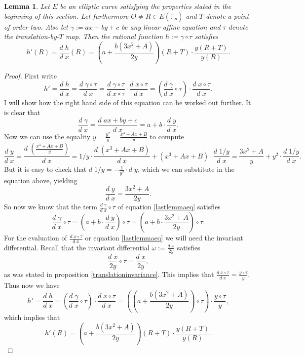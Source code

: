 \documentclass{article}
\numberwithin{equation}{section}
\newtheorem{lemma}[theorem]{Lemma}
\theoremstyle{definition}
\newcommand{\FF}[1]{{\mathbb F}_{#1}} %
\begin{document}
\begin{lemma}
Let $E$ be an elliptic curve satisfying the properties stated in the beginning of this section. Let furthermore $O\neq R\in E(\FF{p})$ and $T$ denote a point of order two. Also let $\gamma:=ax+by+c$ be any linear affine equation and $\tau$ denote the translation-by-$T$ map. Then the rational function $h:=\gamma \circ \tau$ satisfies $$ h'(R)=\frac{d\; h}{d\; x} (R) = \left( a+\frac{b(3x^2+A)}{2y}\right)(R+T) \cdot \frac{y(R+T)}{y(R)}.$$
\end{lemma}

\begin{proof}
First write \begin{equation}\label{lastlemmaeq}h'=\frac{d\; h}{d\;x}=\frac{d\; \gamma \circ \tau}{d\;x}=\frac{d\; \gamma \circ \tau}{d\; x \circ \tau} \cdot \frac{ d\; x \circ \tau}{d\;x} = \left( \frac{d\; \gamma}{d\; x} \circ \tau \right) \cdot \frac{d\; x \circ \tau}{ d\;x}.\end{equation}
I will show how the right hand side of this equation can be worked out further. It is clear that $$\frac{d\;\gamma}{d\;x} = \frac{d\;ax+by+c}{d\;x}=a+b\cdot \frac{d\;y}{d\;x}.$$ 
Now we can use the equality $y=\frac{y^2}{y}=\frac{x^3+Ax+B}{y}$ to compute 
$$\frac{d\;y}{d\;x}=\frac{d\;(\frac{x^3+Ax+B}{y})}{d\;x}=1/y\cdot\frac{d\;(x^3+Ax+B)}{d\;x}+(x^3+Ax+B)\cdot\frac{d\;1/y}{d\;x}=\frac{3x^2+A}{y}+y^2\cdot\frac{d\;1/y}{d\;x}.$$ But it is easy to check that $d\;1/y=-\frac{1}{y^2}\cdot d\;y$, which we can substitute in the equation above, yielding $$\frac{d\;y}{d\;x}= \frac{3x^2+A}{2y}.$$
So now we know that the term $\frac{d\;\gamma}{d\;x}\circ \tau$ of equation \ref{lastlemmaeq} satisfies 
$$\frac{d\;\gamma}{d\;x} \circ \tau = \left(a+b\cdot\frac{d\;y}{d\;x}\right)\circ\tau=\left(a+b\cdot \frac{3x^2+A}{2y}\right)\circ \tau.$$
For the evaluation of $\frac{d\; x \circ \tau}{d\;x}$ or equation \ref{lastlemmaeq} we will need the invariant differential. Recall that the invariant differential $\omega:=\frac{d \; x}{2y}$ satisfies 
$$\frac{d\;x}{2y} \circ \tau = \frac{d\;x}{2y},$$ 
as was stated in proposition \ref{translationinvariance}. This implies that $\frac{d \; x\circ \tau}{d\;x} = \frac{y \circ \tau}{y}$.
Thus now we have $$h'= \frac{d\;h}{d\;x}=\left(\frac{d\;\gamma}{d\;x} \circ \tau\right) \cdot \frac{d\;x \circ\tau}{d\;x}=\left(\left(a+\frac{b(3x^2+A)}{2y}\right)\circ \tau\right)\cdot\frac{y\circ \tau}{y},$$ which implies that $$h'(R)=\left( a+\frac{b(3x^2+A)}{2y}\right)(R+T) \cdot \frac{y(R+T)}{y(R)}.$$
\end{proof}
\end{document}

